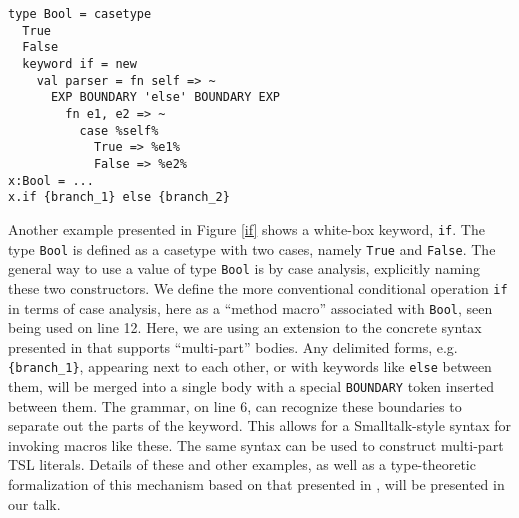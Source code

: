 \documentclass[letterpaper, notitlepage]{article}
\begin{document}
\begin{figure*}[htb!]
\begin{center}
\begin{lstlisting}[style=wyvern]
type Bool = casetype
  True
  False
  keyword if = new
    val parser = fn self => ~
      EXP BOUNDARY 'else' BOUNDARY EXP
        fn e1, e2 => ~
          case %self%
            True => %e1%
            False => %e2%
x:Bool = ...
x.if {branch_1} else {branch_2}
\end{lstlisting}
\end{center}
\vspace{-15px}
\caption{``White-box'' keyword \texttt{if} defined as a member of  type \texttt{Bool}}
\vspace{-10px}
\label{if}
\end{figure*}
\par

Another example presented in Figure \ref{if} shows a white-box keyword, \texttt{if}. The type \verb|Bool| is defined as a casetype with two cases, namely \verb|True| and \verb|False|. The general way to use a value of type \verb|Bool| is by case analysis, explicitly naming these two constructors. We define the more conventional conditional operation \texttt{if} in terms of case analysis, here as a ``method macro'' associated with \texttt{Bool}, seen being used on line 12. Here, we are using an extension to the concrete syntax presented in \cite{TSLs} that supports ``multi-part'' bodies. Any delimited forms, e.g. \verb|{branch_1}|, appearing next to each other, or with keywords like \verb|else| between them, will be merged into a single body with a special \verb|BOUNDARY| token inserted between them. The grammar, on line 6, can recognize these boundaries to separate out the parts of the keyword. This allows for a  Smalltalk-style syntax for invoking  macros like these. The same syntax can be used to construct multi-part TSL literals. Details of these and other examples, as well as a type-theoretic formalization of this mechanism based on that presented in \cite{TSLs}, will be presented in our talk.


 
\end{document}
